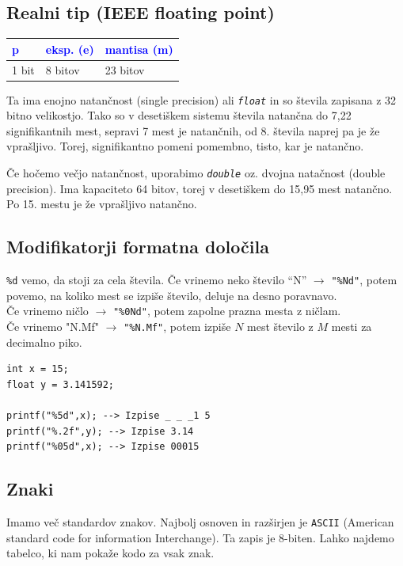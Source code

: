 \documentclass[a4paper, 12pt]{article}
\begin{document}
\subsection{Realni tip (IEEE floating point)}
\begin{table}[!htbp]
	\centering
	\begin{tabular}{|l|l|l|}
		\hline \textcolor{blue}{p} & \textcolor{blue}{eksp. (e)} & \textcolor{blue}{mantisa (m)} \\ \hline
		1 bit & 8 bitov & 23 bitov \\ \hline
	\end{tabular}
\end{table}

Ta ima enojno natančnost (single precision) ali \emph{\texttt{float}} in so števila zapisana z 32 bitno velikostjo. Tako so v desetiškem sistemu števila natančna do 7,22 signifikantnih mest, sepravi 7 mest je natančnih, od 8. števila naprej pa je že vprašljivo. Torej, signifikantno pomeni pomembno, tisto, kar je natančno.\

Če hočemo večjo natančnost, uporabimo \emph{\texttt{double}} oz. dvojna natačnost (double precision). Ima kapaciteto 64 bitov, torej v desetiškem do 15,95 mest natančno. Po 15. mestu je že vprašljivo natančno.


\subsection{Modifikatorji formatna določila}
\verb|%d| vemo, da stoji za cela števila. Če vrinemo neko število ``N'' $\to$ \texttt{"\%Nd"}, potem povemo, na koliko mest se izpiše število, deluje na desno poravnavo.\\
Če vrinemo ničlo $\to$ \texttt{"\%0Nd"}, potem zapolne prazna mesta z ničlam.\\
Če vrinemo "N.Mf" $\to$ \texttt{"\%N.Mf"}, potem izpiše $N$ mest število z $M$ mesti za decimalno piko.

\begin{lstlisting}
int x = 15;
float y = 3.141592;

printf("%5d",x); --> Izpise _ _ _1 5
printf("%.2f",y); --> Izpise 3.14
printf("%05d",x); --> Izpise 00015
\end{lstlisting} 

\subsection{Znaki}
Imamo več standardov znakov. Najbolj osnoven in razširjen je \texttt{ASCII} (American standard code for information Interchange). Ta zapis je 8-biten. Lahko najdemo tabelco, ki nam pokaže kodo za vsak znak.
\end{document}
